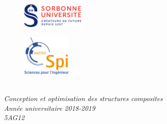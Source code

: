 \documentclass[12pt,a4paper]{article}
\begin{document}
\setcounter{tocdepth}{2}

\newenvironment{changemargin}[2]{\begin{list}{}{%
\setlength{\topsep}{0pt}%
\setlength{\leftmargin}{0pt}%
\setlength{\rightmargin}{0pt}%
\setlength{\listparindent}{\parindent}%
\setlength{\itemindent}{\parindent}%
\setlength{\parsep}{0pt plus 1pt}%
\addtolength{\leftmargin}{#1}%
\addtolength{\rightmargin}{#2}%
}\item }{\end{list}}

\headsep 0cm
\textheight=23cm
\textwidth=16.8cm
\hoffset=0.0cm
\oddsidemargin 0cm
\evensidemargin 0cm
\voffset=0.5cm
\topmargin 0cm
\headheight 0.5cm

\begin{titlepage}
\begin{center}

\begin{figure}[h]
\vspace{-22mm}
\hspace{5mm}
\includegraphics[width=0.28\textwidth]{images/sorbonne.png}
\end{figure}
\begin{figure}[h]
\vspace{-35mm}
\hspace{110mm}
\includegraphics[width=0.22\textwidth]{images/spi.jpg}
\end{figure}
\vspace{-1mm}
\Huge{\textbf{\underline{\hspace{15cm}}}}\\

\large{\textit{Conception et optimisation des structures composites\\
Année universitaire 2018-2019\\
5AG12 \\ 
\vspace{-1cm}}}
\Huge{\textbf{\underline{\hspace{15cm}}}}\\


\end{center}
\end{titlepage}
\end{document}
